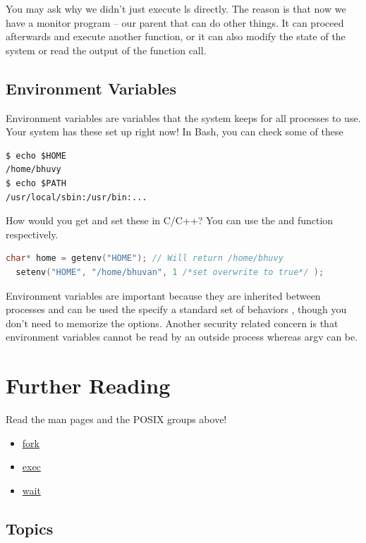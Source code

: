 \begin{itemize}
\begin{itemize}
You may ask why we didn't just execute ls directly.
The reason is that now we have a monitor program -- our parent that can do other things.
It can proceed afterwards and execute another function, or it can also modify the state of the system or read the output of the function call.

\subsection{Environment Variables}

Environment variables are variables that the system keeps for all processes to use.
Your system has these set up right now!
In Bash, you can check some of these

\begin{verbatim}
$ echo $HOME
/home/bhuvy
$ echo $PATH
/usr/local/sbin:/usr/bin:...
\end{verbatim}

How would you get and set these in C/C++? You can use the  and  function respectively.

\begin{lstlisting}[language=C]
  char* home = getenv("HOME"); // Will return /home/bhuvy
  setenv("HOME", "/home/bhuvan", 1 /*set overwrite to true*/ );
\end{lstlisting}

Environment variables are important because they are inherited between processes and can be used the specify a standard set of behaviors \cite{env_std_2018}, though you don't need to memorize the options.
Another security related concern is that environment variables cannot be read by an outside process whereas argv can be.

\section{Further Reading}

Read the man pages and the POSIX groups above!

\begin{itemize}
\item \href{http://man7.org/linux/man-pages/man2/fork.2.html}{fork}
\item \href{http://man7.org/linux/man-pages/man3/exec.3.html}{exec}
\item \href{http://man7.org/linux/man-pages/man2/wait.2.html}{wait}
\end{itemize}

\subsection{Topics}


\end{itemize}
\end{itemize}
